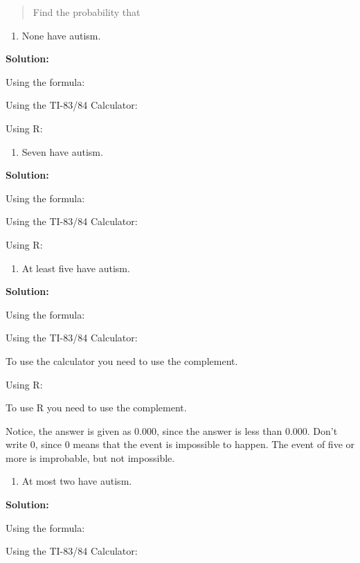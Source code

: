 \documentclass[]{book}
\providecommand{\tightlist}{%
  \setlength{\itemsep}{0pt}\setlength{\parskip}{0pt}}
\begin{document}
\begin{quote}
Find the probability that
\end{quote}

\begin{enumerate}
\def\labelenumi{\alph{enumi}.}
\setcounter{enumi}{2}
\tightlist
\item
  None have autism.
\end{enumerate}

\textbf{Solution:}

Using the formula:

Using the TI-83/84 Calculator:

Using R:

\begin{enumerate}
\def\labelenumi{\alph{enumi}.}
\setcounter{enumi}{3}
\tightlist
\item
  Seven have autism.
\end{enumerate}

\textbf{Solution:}

Using the formula:

Using the TI-83/84 Calculator:

Using R:

\begin{enumerate}
\def\labelenumi{\alph{enumi}.}
\setcounter{enumi}{4}
\tightlist
\item
  At least five have autism.
\end{enumerate}

\textbf{Solution:}

Using the formula:

Using the TI-83/84 Calculator:

To use the calculator you need to use the complement.

Using R:

To use R you need to use the complement.

Notice, the answer is given as 0.000, since the answer is less than
0.000. Don't write 0, since 0 means that the event is impossible to
happen. The event of five or more is improbable, but not impossible.

\begin{enumerate}
\def\labelenumi{\alph{enumi}.}
\setcounter{enumi}{5}
\tightlist
\item
  At most two have autism.
\end{enumerate}

\textbf{Solution:}

Using the formula:

Using the TI-83/84 Calculator:
\end{document}
